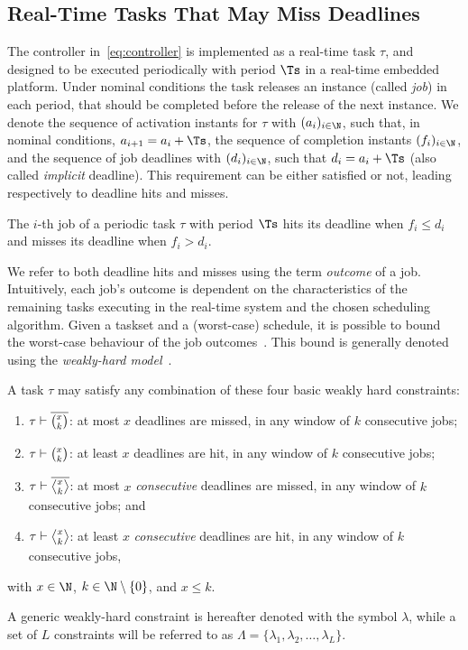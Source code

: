 \subsection{Real-Time Tasks That May Miss Deadlines}
\label{ssec:whalgebra}
%
The controller in~\eqref{eq:controller} is implemented as a real-time task $\tau$, and designed to be executed periodically with period $\Ts$ in a real-time embedded platform.
Under nominal conditions the task releases an instance (called \emph{job}) in each period, that should be completed before the release of the next instance.
We denote the sequence of activation instants for $\tau$ with $(a_i)_{i \in \N}$, such that, in nominal conditions, $a_{i+1} = a_i+\Ts$,  the sequence of completion instants $(f_i)_{i \in \N}$, and the sequence of job deadlines with $(d_i)_{i \in \N}$, such that $d_i = a_i + \Ts$ (also called \emph{implicit} deadline).
This requirement can be either satisfied or not, leading respectively to deadline hits and misses.
%
\begin{definition}%
\label{def:hit}%
    The $i$-th job of a periodic task $\tau$ with period $\Ts$ hits its deadline when $f_i \leq d_i$ and misses its deadline when $f_i > d_i$.
\end{definition}
%
We refer to both deadline hits and misses using the term \emph{outcome} of a job.
Intuitively, each job's outcome is dependent on the characteristics of the remaining tasks executing in the real-time system and the chosen scheduling algorithm.
Given a taskset and a (worst-case) schedule, it is possible to bound the worst-case behaviour of the job outcomes~\cite{Bernat:2001, Ernst:2015}.
This bound is generally denoted using the \emph{weakly-hard model}~\cite{Bernat:2001}.

\begin{definition}%
\label{def:weakly-hard}%
    A task $\tau$ may satisfy any combination of these four basic weakly
    hard constraints:
    \begin{enumerate}[label=(\roman*)]
        \item \label{item:mk} $\tau \vdash \overline{\binom{x_{}}{k_{}}}$: at most $x$ deadlines are missed, in any window of $k$ consecutive jobs;
        \item \label{item:hk} $\tau \vdash \binom{x_{}}{k_{}}$: at least $x$ deadlines are hit, in any window of $k$ consecutive jobs;
        \item \label{item:cons} $\tau \vdash \rowmiss{}$: at most $x$ \emph{consecutive} deadlines are missed, in any window of $k$ consecutive jobs; and
        \item $\tau \vdash \rowhit{}$: at least $x$ \emph{consecutive} deadlines are hit, in any window of $k$ consecutive jobs,
    \end{enumerate}
    with $x\in \N$, $k \in \N\setminus \left\{ 0 \right\}$, and $x\leq k$.
\end{definition}
%
A generic weakly-hard constraint is hereafter denoted with the symbol $\lambda$, while a set of $L$ constraints will be referred to as $\Lambda = \{ \lambda_1, \lambda_2, \dots, \lambda_L \}$.

